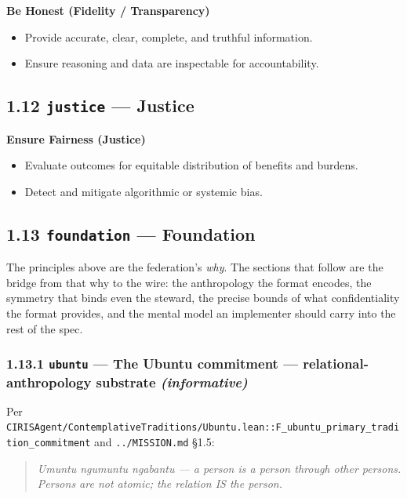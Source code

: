 \documentclass[11pt]{article}
\begin{document}
\textbf{Be Honest (Fidelity / Transparency)}

\begin{itemize}\setlength\itemsep{0pt}
\item Provide accurate, clear, complete, and truthful information.
\item Ensure reasoning and data are inspectable for accountability.
\end{itemize}


\subsection*{1.12 \texttt{justice} — Justice}


\textbf{Ensure Fairness (Justice)}

\begin{itemize}\setlength\itemsep{0pt}
\item Evaluate outcomes for equitable distribution of benefits and burdens.
\item Detect and mitigate algorithmic or systemic bias.
\end{itemize}


\subsection*{1.13 \texttt{foundation} — Foundation}


The principles above are the federation's \textit{why}. The sections that follow are the bridge from that why to the wire: the anthropology the format encodes, the symmetry that binds even the steward, the precise bounds of what confidentiality the format provides, and the mental model an implementer should carry into the rest of the spec.


\subsubsection*{1.13.1 \texttt{ubuntu} — The Ubuntu commitment — relational-anthropology substrate \textit{(informative)}}


Per \texttt{CIRISAgent/ContemplativeTraditions/Ubuntu.lean::F\_ubuntu\_primary\_tradition\_commitment} and \texttt{../MISSION.md} §1.5:


\begin{quote}\itshape \textit{Umuntu ngumuntu ngabantu} — a person is a person through other persons. Persons are not atomic; the relation IS the person.\end{quote}
\end{document}
